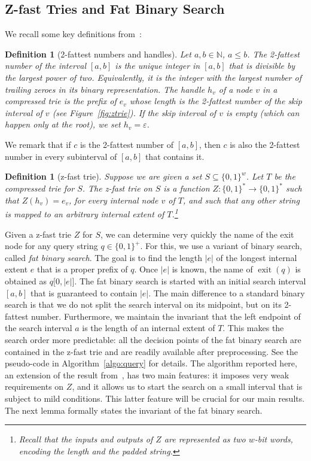 \documentclass[a4paper,11pt]{article}
\newtheorem{definition}[theorem]{Definition}
\newcommand{\eps}{\varepsilon}
\newcommand{\N}{\mathbb{N}}
\newcommand{\?}{\mskip1.5mu}
\DeclareMathOperator{\exit}{exit}
\begin{document}
\subsection{Z-fast Tries and Fat Binary Search}

We recall some key definitions from~\cite{BelazzouguiBoPaVi09}:

\begin{definition}[2-fattest numbers and handles] 
\label{def:twofattest}
Let $a, b \in \N$, $a \leq b$. The \emph{2-fattest number} 
of the interval $[a, b]$ is the unique integer in $[a, b]$ 
that is divisible by the largest power of two. Equivalently, 
it is the integer with the largest number of trailing zeroes 
in its binary representation. The \emph{handle} $h_v$ of a 
node $v$ in a compressed trie is the prefix of $e_v$ whose 
length is the 2-fattest number of the skip interval of $v$
(see Figure~\ref{fig:ztrie}). If the skip interval of $v$ 
is empty (which can happen only at the root), we set 
$h_v = \eps$.
\end{definition}

We remark that if $c$ is the 2-fattest number of $[a, b]$, then 
$c$ is also the 2-fattest number in every subinterval of $[a, b]$ 
that contains it.

\begin{definition}[z-fast trie]
Suppose we are given a set $S \subseteq \{0, 1\}^w$. Let $T$ be the 
compressed trie for $S$. The \emph{z-fast trie on $S$} is 
a function $Z : \{0, 1\}^* \rightarrow \{0, 1\}^*$ such that 
$Z(h_v) = e_v$, for every internal node $v$ of $T$, and such
that any other string is mapped to an arbitrary internal extent
of $T$.\footnote{Recall that the inputs and outputs of $Z$
are represented as two $w$-bit words, encoding the length
and the padded string.}
\end{definition}

Given a z-fast trie $Z$ for $S$, we can determine very 
quickly the name of the exit node for any query string $q \in \{0,1\}^+$.
For this, we use a variant of binary search, called 
\emph{fat binary search}.
The goal is to find the length $|e|$ of the 
longest internal extent $e$ that is a proper 
prefix of $q$. Once $|e|$ is known, the name 
of $\exit(q)$ is obtained as $q\big[0, |e|\big]$.
The fat binary search is started with an initial
search interval $[a,b]$ that is guaranteed
to contain $|e|$. The main difference to
a standard binary search is that we do
not split the search interval on its
midpoint, but on its 2-fattest number.
Furthermore, we maintain the invariant
that the left endpoint of the search interval $a$ 
is the length of an internal extent
of $T$.  This makes the search order more
predictable: all the decision points of the
fat binary search are contained in the z-fast trie
and are readily available after preprocessing.
See the pseudo-code in Algorithm~\ref{algo:query} for details. 
The algorithm reported here, an extension of the 
result from~\cite{BelazzouguiBoVi10}, has two main features:
it imposes very weak requirements on $Z$, and it allows us to start 
the search on a small interval that is subject to
mild conditions. This latter feature will be crucial 
for our main results. The next lemma formally states
the invariant of the fat binary search.
\end{document}

